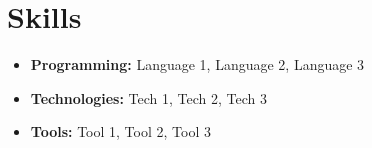 \section*{Skills}
\begin{itemize}
    \item[] \textbf{Programming:} Language 1, Language 2, Language 3
    \item[] \textbf{Technologies:} Tech 1, Tech 2, Tech 3
    \item[] \textbf{Tools:} Tool 1, Tool 2, Tool 3
\end{itemize}
\sectionspace 